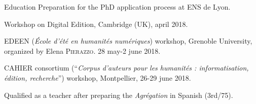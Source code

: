 \begin{rubric}{Education}
                                \entry*[2017-2018]
                            Preparation for the PhD application process at ENS
                        de Lyon.
                    
                                \entry*
                            Workshop on Digital Edition, Cambridge (UK), april
                        2018.
                    
                                 EDEEN (\textit{École d'été en humanités
                        numériques}) workshop, Grenoble University,
                        organized by Elena \textsc{Pierazzo}. 28
                        may-2 june 2018.
                    
                                 CAHIER consortium (\enquote{\textit{Corpus d’auteurs
                        pour les humanités : informatisation, édition,
                        recherche}}) workshop, Montpellier, 26-29 june
                        2018.
                    
                                \entry*[2016-2017]
                            Qualified as a teacher after preparing the
                        \textit{Agrégation} in Spanish (3rd/75).
                    

\end{rubric}
